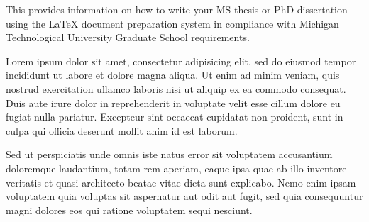 %

This provides information on how to write your MS thesis or PhD dissertation 
using the \LaTeX{} document preparation system in compliance with Michigan 
Technological University Graduate School requirements.

Lorem ipsum dolor sit amet, consectetur adipisicing elit, sed do eiusmod 
tempor incididunt ut labore et dolore magna aliqua. Ut enim ad minim veniam, 
quis nostrud exercitation ullamco laboris nisi ut aliquip ex ea commodo 
consequat. Duis aute irure dolor in reprehenderit in voluptate velit esse 
cillum dolore eu fugiat nulla pariatur. Excepteur sint occaecat cupidatat 
non proident, sunt in culpa qui officia deserunt mollit anim id est laborum.

Sed ut perspiciatis unde omnis iste natus error sit voluptatem accusantium 
doloremque laudantium, totam rem aperiam, eaque ipsa quae ab illo inventore 
veritatis et quasi architecto beatae vitae dicta sunt explicabo. Nemo enim 
ipsam voluptatem quia voluptas sit aspernatur aut odit aut fugit, sed quia 
consequuntur magni dolores eos qui ratione voluptatem sequi nesciunt.

